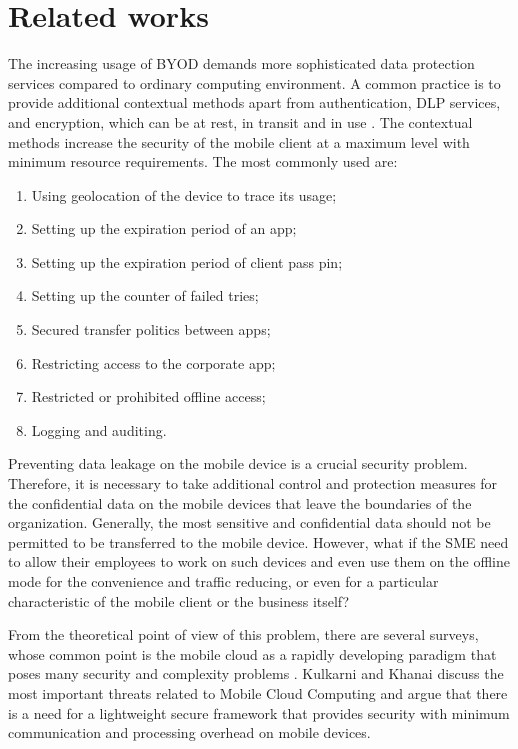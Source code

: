 \documentclass[twocolumn]{svjour3}          	%
\begin{document}
\section{Related works}
\label{sec_related_works}
The increasing usage of BYOD demands more sophisticated data protection services compared to ordinary computing environment. A common practice is to provide additional contextual methods apart from authentication, DLP services, and encryption, which can be at rest, in transit and in use \cite{yovel2014, khan2015cloud, khan2014survey, khan2013towards}. The contextual methods increase the security of the mobile client at a maximum level with minimum resource requirements. The most commonly used are:

\begin{enumerate}
	\item Using geolocation of the device to trace its usage;
	\item Setting up the expiration period of an app;
	\item Setting up the expiration period of client pass pin;
	\item Setting up the counter of failed tries;
	\item Secured transfer politics between apps;
	\item Restricting access to the corporate app;
	\item Restricted or prohibited offline access;
	\item Logging and auditing.
\end{enumerate}

Preventing data leakage on the mobile device is a crucial security problem. Therefore, it is necessary to take additional control and protection measures for the confidential data on the mobile devices that leave the boundaries of the organization. Generally, the most sensitive and confidential data should not be permitted to be transferred to the mobile device. However, what if the SME need to allow their employees to work on such devices and even use them on the offline mode for the convenience and traffic reducing, or even for a particular characteristic of the mobile client or the business itself?

From the theoretical point of view of this problem, there are several surveys, whose common point is the mobile cloud as a rapidly developing paradigm that poses many security and complexity problems \cite{khan2013towards, yovel2014, khan2014survey, khan2015cloud, mayrhofer2015architecture, chang2015design, xia2015tinman, kulkarni2015addressing, shila2016amcloud, heydari2016efficient}. Kulkarni and Khanai \cite{kulkarni2015addressing} discuss the most important threats related to Mobile Cloud Computing and argue that there is a need for a lightweight secure framework that provides security with minimum communication and processing overhead on mobile devices. 
\end{document}
